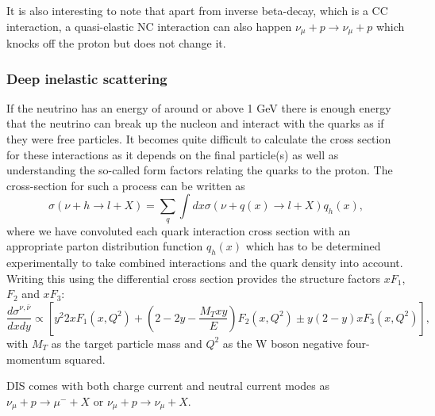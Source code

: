 It is also interesting to note that apart from inverse beta-decay, which is a CC interaction, a quasi-elastic NC interaction can also happen $\nu_\mu + p \rightarrow \nu_\mu + p$ which knocks off the proton but does not change it.


\subsubsection{Deep inelastic scattering}
If the neutrino has an energy of around or above 1 GeV there is enough energy that the neutrino can break up the nucleon and interact with the quarks as if they were free particles. It becomes quite difficult to calculate the cross section for these interactions as it depends on the final particle(s) as well as understanding the so-called form factors relating the quarks to the proton. The cross-section for such a process can be written as
\begin{equation}
 \sigma( \nu + h \rightarrow l + X) = \sum_q \int dx \sigma ( \nu + q(x) \rightarrow l + X) q_h (x),
\end{equation}
where we have convoluted each quark interaction cross section with an appropriate parton distribution function $q_h(x)$ which has to be determined experimentally to take combined interactions and the quark density into account. Writing this using the differential cross section provides the structure factors $xF_1$, $F_2$ and $xF_3$:
\begin{equation}
\frac{d\sigma^{\nu,\bar{\nu}}}{dxdy}\propto \left[ y^2 2xF_1 (x,Q^2) + (2-2y-\frac{M_T xy}{E})F_2 (x,Q^2)\pm y(2-y)xF_3 (x,Q^2)\right],
\end{equation}
 with $M_T$ as the target particle mass and $Q^2$ as the W boson negative four-momentum squared.

DIS comes with both charge current and neutral current modes as $\nu_\mu + p \rightarrow \mu^- + X$ or $\nu_\mu + p \rightarrow \nu_\mu + X$.

